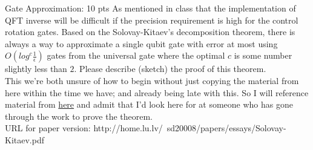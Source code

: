 \documentclass[12pt]{article}
\makeatletter
\newcommand{\<}{\langle}
\renewcommand{\>}{\rangle}
\newenvironment{problem}{\@startsection
       {section}
       {1}
       {-.2em}
       {-3.5ex plus -1ex minus -.2ex}
       {2.3ex plus .2ex}
       {\pagebreak[3]
       \large\bf\noindent{Problem }
       }
       }
       {%
       \begin{center}\large\bf \end{center}}
\makeatother
\begin{document}
\begin{problem}{Gate Approximation: 10 pts}
As mentioned in class that the implementation of QFT inverse will be difficult if the precision requirement is high for the control rotation gates. Based on the Solovay-Kitaev’s decomposition theorem, there is always a way to approximate a single qubit gate with error at most using $O(log^c\frac{1}{\epsilon})$ gates from the universal gate where the optimal $c$ is some number slightly less than $2$. Please describe (sketch) the proof of this theorem.\\
This we're both unsure of how to begin without just copying the material from here within the time we have; and already being late with this. So I will reference material from \href{http://home.lu.lv/~sd20008/papers/essays/Solovay-Kitaev.pdf}{here} and admit that I'd look here for at someone who has gone through the work to prove the theorem.\\

URL for paper version: http://home.lu.lv/~sd20008/papers/essays/Solovay-Kitaev.pdf
\end{problem}
\end{document}
